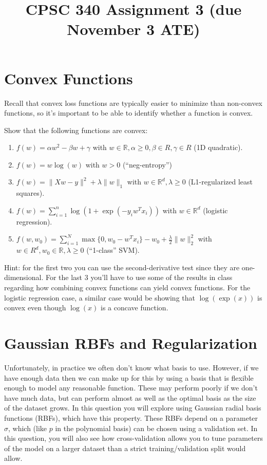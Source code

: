 \documentclass{article}
\def\blu#1{{\color{blu}#1}}
\def\norm#1{\|#1\|}
\def\R{\mathbb{R}}
\def\enum#1{\begin{enumerate}#1\end{enumerate}}
\begin{document}
\title{CPSC 340 Assignment 3 (due November 3 ATE)}
\author{}
\date{}
\maketitle
\vspace{-4em}



\section{Convex Functions}

Recall that convex loss functions are typically easier to minimize than non-convex functions, so it's important to be able to identify whether a function is convex.

\blu{Show that the following functions are convex}:

\enum{
\item $f(w) = \alpha w^2 - \beta w + \gamma$ with $w \in \R, \alpha \geq 0, \beta \in R, \gamma \in R$ (1D quadratic).
\item $f(w) = w\log(w) $ with $w > 0$ (``neg-entropy'')
\item $f(w) = \norm{Xw-y}^2 + \lambda\norm{w}_1$ with $w \in \R^d, \lambda \geq 0$ (L1-regularized least squares).
\item $f(w) = \sum_{i=1}^n \log(1+\exp(-y_iw^Tx_i)) $ with $w \in \R^d$ (logistic regression).
\item $f(w,w_0) = \sum_{i=1}^N\max\{0,w_0 - w^Tx_i\} - w_0 + \frac{\lambda}{2}\norm{w}_2^2$  with $w \in R^d, w_0 \in \R, \lambda \geq 0$ (``1-class'' SVM).
}

Hint: for the first two you can use the second-derivative test since they are one-dimensional. For the last 3 you'll have to use some of the results in class regarding how combining convex functions  can yield convex functions. For the logistic regression case, a similar case would be showing that $\log(\exp(x))$ is convex even though $\log(x)$ is a concave function.



\section{Gaussian RBFs and Regularization}

Unfortunately, in practice we often don't know what basis to use. However, if we have enough data then we can make up for this by using a basis that is flexible enough to model any reasonable function. These may perform poorly if we don't have much data, but can perform almost as well as the optimal basis as the size of the dataset grows. In this question you will explore using Gaussian radial basis functions (RBFs), which have this property. These RBFs depend on a parameter $\sigma$, which (like $p$ in the polynomial basis) can be chosen using a validation set. In this question, you will also see how cross-validation allows you to tune parameters of the model on a larger dataset than a strict training/validation split would allow.
\end{document}
